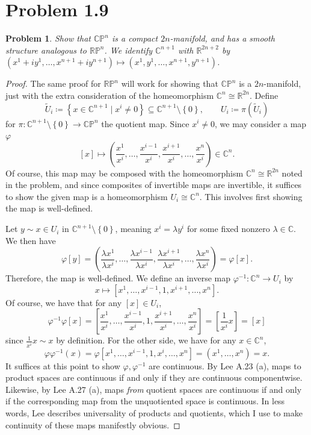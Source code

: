 \documentclass[11pt, letterpaper]{article}
\theoremstyle{theorem}
\newtheorem{problem}{Problem}
\begin{document}
\section{Problem 1.9}

\begin{problem}\label{4}
	Show that $\mathbb{C} \mathbb{P} ^n$ is a compact $2n$-manifold, and has a smooth structure analogous to $\mathbb{R} \mathbb{P} ^n$. We identify $\mathbb{C} ^{n+1} $ with $\mathbb{R} ^{2n+2} $ by $(x^1+iy^1, \ldots ,x^{n+1} +iy^{n+1} )\mapsto (x^1,y^1, \ldots ,x^{n+1} ,y^{n+1} )$.
\end{problem}
\begin{proof}
	The same proof for $\mathbb{R} \mathbb{P} ^n$ will work for showing that $\mathbb{C} \mathbb{P} ^n$ is a $2n$-manifold, just with the extra consideration of the homeomorphism $\mathbb{C} ^n\cong \mathbb{R} ^{2n} $. Define
	\[
		\widetilde{U} _i\coloneqq \left\{ x\in\mathbb{C} ^{n+1} \mid x^i\neq 0 \right\}\subseteq \mathbb{C} ^{n+1} \setminus \left\{ 0 \right\}  ,\qquad U_i\coloneqq \pi (\widetilde{U} _i)
	\]
	for $\pi : \mathbb{C} ^{n+1} \setminus \left\{ 0 \right\} \to \mathbb{C} \mathbb{P} ^n$ the quotient map. Since $x^i\neq 0$, we may consider a map $\varphi $
	\[
		[x]\mapsto \left( \frac{x^1}{x^i} , \ldots ,\frac{x^{i-1} }{x^i} ,\frac{x^{i+1} }{x^i} ,\ldots ,\frac{x^n}{x^i} \right)\in\mathbb{C} ^{n} .
	\]
	Of course, this map may be composed with the homeomorphism $\mathbb{C} ^n \cong \mathbb{R}^{2n} $ noted in the problem, and since composites of invertible maps are invertible, it suffices to show the given map is a homeomorphism $U_i\cong \mathbb{C} ^n$. This involves first showing the map is well-defined.

	Let $y\sim x\in U_i$ in $\mathbb{C} ^{n+1} \setminus \left\{ 0 \right\} $, meaning $x^i=\lambda y^i$ for some fixed nonzero $\lambda \in\mathbb{C} $. We then have
	\[
		\varphi [y]=\left( \frac{\lambda x^1}{\lambda x^i} , \ldots , \frac{\lambda x^{i-1} }{\lambda x^i} ,\frac{\lambda x^{i+1} }{\lambda x^i} ,\ldots ,\frac{\lambda x^n}{\lambda x^i}  \right) =\varphi [x]
	.\]
	Therefore, the map is well-defined. We define an inverse map $\varphi ^{-1} : \mathbb{C} ^n \to U_i$ by
	\[
		x\mapsto \left[ x^1, \ldots ,x^{i-1} ,1,x^{i+1} ,\ldots ,x^n \right] 
	.\]
	Of course, we have that for any $[x]\in U_i$,
	\[
		\varphi ^{-1} \varphi [x]=\left[ \frac{x^1}{x^i} , \ldots ,\frac{x^{i-1} }{x^i} ,1,\frac{x^{i+1} }{x^i} ,\ldots ,\frac{x^n}{x^i}  \right] =\left[ \frac{1}{x^i} x \right] =[x]
	\]
	since $\frac{1}{x^i} x\sim x$ by definition. For the other side, we have for any $x\in\mathbb{C} ^n$,
	\[
		\varphi \varphi ^{-1} (x)=\varphi \left[ x^1, \ldots ,x^{i-1} , 1, x^i, \ldots ,x^n \right] =\left( x^1, \ldots ,x^n \right) =x
	.\]
	It suffices at this point to show $\varphi ,\varphi ^{-1} $ are continuous. By Lee A.23 (a), maps to product spaces are continuous if and only if they are continuous componentwise. Likewise, by Lee A.27 (a), maps \emph{from} quotient spaces are continuous if and only if the corresponding map from the unquotiented space is continuous. In less words, Lee describes universality of products and quotients, which I use to make continuity of these maps manifestly obvious.


\end{proof}
\end{document}
